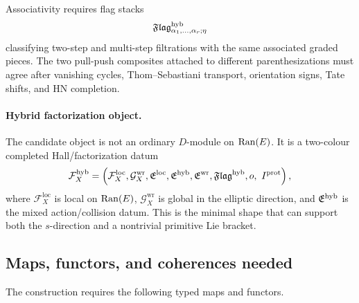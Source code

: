 Associativity requires flag stacks
\[
        \mathfrak{Flag}^{\mathrm{hyb}}_{\alpha_1,\ldots,\alpha_r;\eta}
\]
classifying two-step and multi-step filtrations with the same associated
graded pieces.  The two pull-push composites attached to different
parenthesizations must agree after vanishing cycles, Thom--Sebastiani
transport, orientation signs, Tate shifts, and HN completion.

\paragraph{Hybrid factorization object.}
The candidate object is not an ordinary \(D\)-module on
\(\operatorname{Ran}(E)\).  It is a two-colour completed Hall/factorization datum
\[
\mathcal F_X^{\mathrm{hyb}}
=
\left(
\mathcal F_X^{\mathrm{loc}},
\mathcal G_X^{\mathrm{wr}},
\mathfrak E^{\mathrm{loc}},\mathfrak E^{\mathrm{hyb}},\mathfrak E^{\mathrm{wr}},\mathfrak{Flag}^{\mathrm{hyb}},
o,\ I^{\mathrm{prot}}
\right),
\]
where \(\mathcal F_X^{\mathrm{loc}}\) is local on \(\operatorname{Ran}(E)\),
\(\mathcal G_X^{\mathrm{wr}}\) is global in the elliptic direction, and
\(\mathfrak E^{\mathrm{hyb}}\) is the mixed action/collision datum.  This is the minimal
shape that can support both the \(s\)-direction and a nontrivial
primitive Lie bracket.

\subsection{Maps, functors, and coherences needed}

The construction requires the following typed maps and functors.

